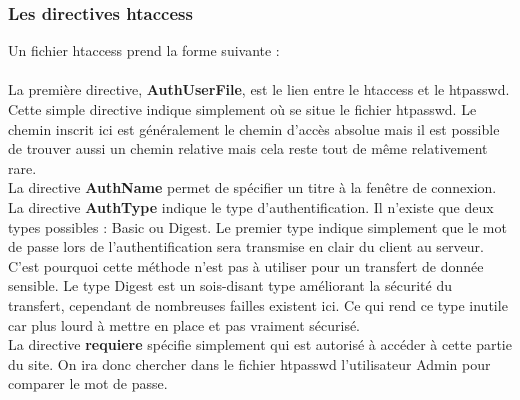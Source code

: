 \documentclass{article}
\begin{document}
\subsubsection{Les directives htaccess}
\hspace*{0.6cm}Un fichier htaccess prend la forme suivante :
\vspace{0.2cm}\\
\vspace{0.2cm}\\
\hspace*{0.6cm}La premi\`ere directive, \textbf{AuthUserFile}, est le lien entre le htaccess et le htpasswd. Cette simple directive indique simplement o\`u se situe le fichier htpasswd. Le chemin inscrit ici est g\'en\'eralement le chemin d'acc\`es absolue mais il est possible de trouver aussi un chemin relative mais cela reste tout de m\^eme relativement rare.
\vspace{0.2cm}\\
La directive \textbf{AuthName} permet de sp\'ecifier un titre \`a la fen\^etre de connexion.
\vspace{0.2cm}\\
\hspace*{0.6cm}La directive \textbf{AuthType} indique le type d'authentification. Il n'existe que deux types possibles : Basic ou Digest. Le premier type indique simplement que le mot de passe lors de l'authentification sera transmise en clair du client au serveur. C'est pourquoi cette m\'ethode n'est pas \`a utiliser pour un transfert de donn\'ee sensible. Le type Digest est un sois-disant type am\'eliorant la s\'ecurit\'e du transfert, cependant de nombreuses failles existent ici. Ce qui rend ce type inutile car plus lourd \`a mettre en place et pas vraiment s\'ecuris\'e.
\vspace{0.2cm}\\
La directive \textbf{requiere} sp\'ecifie simplement qui est autoris\'e \`a acc\'eder \`a cette partie du site. On ira donc chercher dans le fichier htpasswd l'utilisateur Admin pour comparer le mot de passe.
\end{document}
